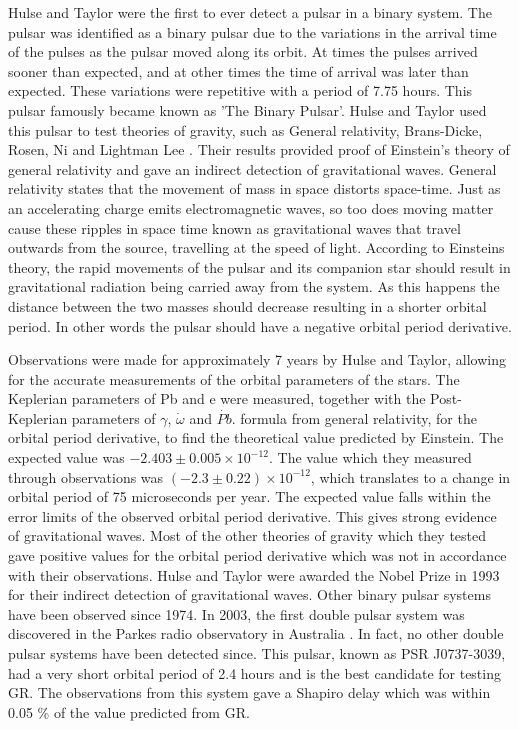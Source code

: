 \documentclass[12pt]{article}
\begin{document}
	Hulse and Taylor were the first to ever detect a pulsar in a binary system. The pulsar was identified as a binary pulsar due to the variations in the arrival time of the pulses as the pulsar moved along its orbit. At times the pulses arrived sooner than expected, and at other times the time of arrival was later than expected. These variations were repetitive with a period of 7.75 hours. This pulsar famously became known as 'The Binary Pulsar'. Hulse and Taylor used this pulsar to test theories of gravity, such as General relativity, Brans-Dicke, Rosen, Ni and Lightman Lee \cite{taylor1982new}. Their results provided proof of Einstein's theory of general relativity and gave an indirect detection of gravitational waves. General relativity states that the movement of mass in space distorts space-time. Just as an accelerating charge emits electromagnetic waves, so too does moving matter cause these ripples in space time known as gravitational waves that travel outwards from the source, travelling at the speed of light. According to Einsteins theory, the rapid movements of the pulsar and its companion star should result in gravitational radiation being carried away from the system. As this happens the distance between the two masses should decrease resulting in a shorter orbital period. In other words the pulsar should have a negative orbital period derivative. 
	
	\noindent Observations were made for approximately 7 years by Hulse and Taylor, allowing for the accurate measurements of the orbital parameters of the stars. The Keplerian parameters of Pb and e were measured, together with the Post-Keplerian parameters of $\gamma$, $\dot{\omega}$ and $\dot{Pb}$.  formula from general relativity, for the orbital period derivative, to find the theoretical value predicted by Einstein. The expected value was $-2.403 \pm 0.005 \times 10^{-12}$. The value which they measured through observations was $(-2.3 \pm 0.22) \times 10^{-12}$, which translates to a change in orbital period of 75 microseconds per year. The expected value falls within the error limits of the observed orbital period derivative. This gives strong evidence of gravitational waves. Most of the other theories of gravity which they tested gave positive values for the orbital period derivative which was not in accordance with their observations. Hulse and Taylor were awarded the Nobel Prize in 1993 for their indirect detection of gravitational waves. Other binary pulsar systems have been observed since 1974. In 2003, the first double pulsar system was discovered in the Parkes radio observatory in Australia \cite{burgay2004highly}. In fact, no other double pulsar systems have been detected since. This pulsar, known as PSR J0737-3039, had a very short orbital period of 2.4 hours and is the best candidate for testing GR. The observations from this system gave a Shapiro delay which was within 0.05 \% of the value predicted from GR.
	
\end{document}
